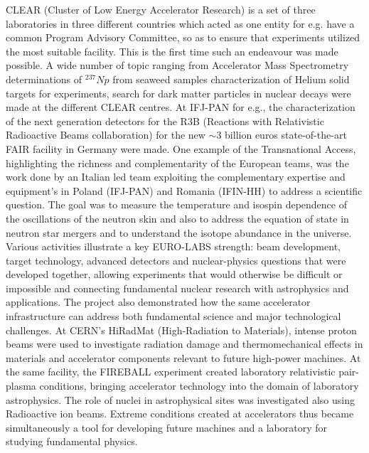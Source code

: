 \begin{itemize}
CLEAR (Cluster of Low Energy Accelerator Research) is a set of three laboratories  in three different countries which acted as one entity for e.g. have a common Program Advisory Committee, so as to ensure that experiments utilized the most suitable facility.  This is the first time such an endeavour was made possible. A wide number of topic ranging from Accelerator Mass Spectrometry determinations of $^{237}Np$ from seaweed samples characterization of Helium solid targets for experiments, search for dark matter particles in nuclear decays were made at the different CLEAR centres. At IFJ-PAN for e.g., the characterization of the next generation detectors for the R3B (Reactions with Relativistic Radioactive Beams collaboration) for the new $\sim$3 billion euros state-of-the-art FAIR facility in Germany were made. One example of the Transnational Access, highlighting the richness and complementarity of the European teams, was the work done by an  Italian led team  exploiting the complementary expertise and equipment’s in Poland  (IFJ-PAN) and Romania  (IFIN-HH) to address a scientific question. The goal was to measure the temperature and isospin dependence of the oscillations of the neutron skin and also to address the equation of state in neutron star mergers and to understand the isotope abundance in the universe. Various activities illustrate a key EURO-LABS strength: beam development, target technology, advanced detectors and nuclear-physics questions that were developed together, allowing experiments that would otherwise be difficult or impossible and connecting fundamental nuclear research with astrophysics and applications.
The project also demonstrated how the same accelerator infrastructure can address both fundamental science and major technological challenges. At CERN’s HiRadMat (High-Radiation to Materials), intense proton beams were used to investigate radiation damage and thermomechanical effects in materials and accelerator components relevant to future high-power machines. At the same facility, the FIREBALL experiment created laboratory relativistic pair-plasma conditions, bringing accelerator technology into the domain of laboratory astrophysics. The role of nuclei in astrophysical sites was investigated also using Radioactive ion beams. Extreme conditions created at accelerators thus became simultaneously a tool for developing future machines and a laboratory for studying fundamental physics.

\end{itemize}
